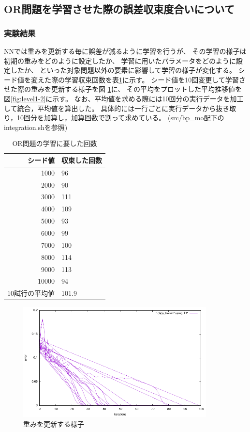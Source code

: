 \subsection{OR問題を学習させた際の誤差収束度合いについて}
\subsubsection{実験結果}
NNでは重みを更新する毎に誤差が減るように学習を行うが、
その学習の様子は初期の重みをどのように設定したか、
学習に用いたパラメータをどのように設定したか、
といった対象問題以外の要素に影響して学習の様子が変化する。
シード値を変えた際の学習収束回数を表\ref{table:level1}に示す。
シード値を10回変更して学習させた際の重みを更新する様子を図
\ref{fig:level1-1}に、
その平均をプロットした平均推移値を図\ref{fig:level1-2}に示す。
なお、平均値を求める際には10回分の実行データを加工して統合，平均値を算出した。
具体的には一行ごとに実行データから抜き取り，10回分を加算し，加算回数で割って求めている。
(src/bp\_mo配下のintegration.shを参照)

\begin{table}[htb]
 \begin{center}
  \caption{OR問題の学習に要した回数}
  \label{table:level1}
  \begin{tabular}[htb]{r|l} \hline
   シード値 & 収束した回数 \\ \hline \hline
   1000 & 96 \\ \hline
   2000 & 90 \\ \hline
   3000 & 111 \\ \hline
   4000 & 109 \\ \hline
   5000 & 93 \\ \hline
   6000 & 99 \\ \hline
   7000 & 100 \\ \hline
   8000 & 114 \\ \hline
   9000 & 113 \\ \hline
   10000 & 94 \\ \hline \hline
   10試行の平均値 & 101.9 \\ \hline
  \end{tabular}
 \end{center}
\end{table}


\begin{figure}[h]
 \begin{center}
  \includegraphics[width=10.0cm]{figs/level1/iterations_vs_error.pdf}
  \caption{重みを更新する様子}
  \label{fig:level1-1}
 \end{center}
\end{figure}

